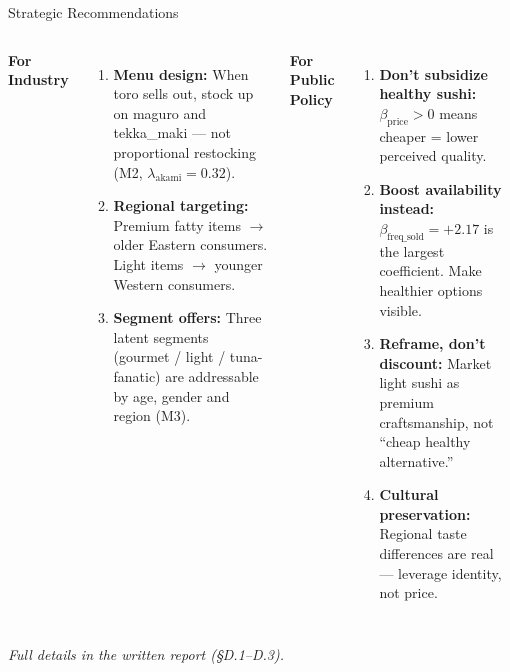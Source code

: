 \documentclass[10pt,aspectratio=169]{beamer}
\begin{document}
\begin{frame}{Strategic Recommendations}
  \begin{columns}[T]
    \textbf{For Industry}
    \begin{enumerate}
      \item \textbf{Menu design:} When toro sells out, stock up on maguro
            and tekka\_maki --- not proportional restocking (M2, $\lambda_{\text{akami}}=0.32$).
      \item \textbf{Regional targeting:} Premium fatty items $\rightarrow$
            older Eastern consumers. Light items $\rightarrow$ younger Western consumers.
      \item \textbf{Segment offers:} Three latent segments (gourmet / light /
            tuna-fanatic) are addressable by age, gender and region (M3).
    \end{enumerate}

    \textbf{For Public Policy}
    \begin{enumerate}
      \item \textbf{Don't subsidize healthy sushi:} $\beta_{\text{price}} > 0$
            means cheaper = lower perceived quality.
      \item \textbf{Boost availability instead:} $\beta_{\text{freq\_sold}} = +2.17$
            is the largest coefficient. Make healthier options visible.
      \item \textbf{Reframe, don't discount:} Market light sushi as premium
            craftsmanship, not ``cheap healthy alternative.''
      \item \textbf{Cultural preservation:} Regional taste differences are real
            --- leverage identity, not price.
    \end{enumerate}
  \end{columns}

  \vspace{8pt}
  \begin{center}
    \small\textit{Full details in the written report (\S D.1--D.3).}
  \end{center}
\end{frame}
\end{document}
